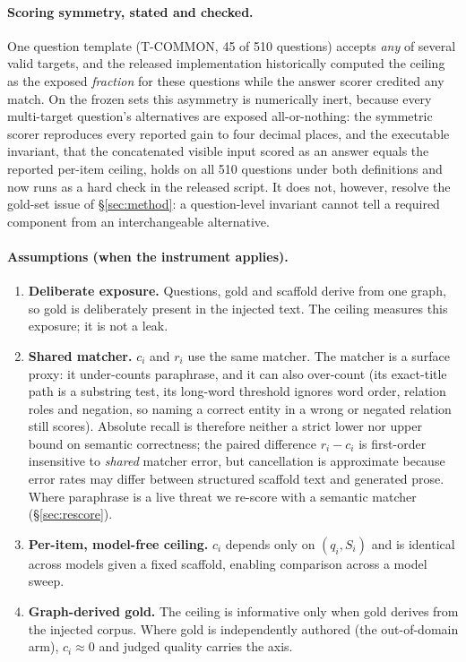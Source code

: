 \documentclass[10pt,twocolumn]{article}
\begin{document}
\paragraph{Scoring symmetry, stated and checked.} One question template (T-COMMON, 45 of 510 questions) accepts \emph{any} of several valid targets, and the released implementation historically computed the ceiling as the exposed \emph{fraction} for these questions while the answer scorer credited any match. On the frozen sets this asymmetry is numerically inert, because every multi-target question's alternatives are exposed all-or-nothing: the symmetric scorer reproduces every reported gain to four decimal places, and the executable invariant, that the concatenated visible input scored as an answer equals the reported per-item ceiling, holds on all 510 questions under both definitions and now runs as a hard check in the released script. It does not, however, resolve the gold-set issue of \S\ref{sec:method}: a question-level invariant cannot tell a required component from an interchangeable alternative.

\paragraph{Assumptions (when the instrument applies).}
\begin{enumerate}[label=(A\arabic*),topsep=2pt,itemsep=1pt,leftmargin=2.4em]
\item \textbf{Deliberate exposure.} Questions, gold and scaffold derive from one graph, so gold is deliberately present in the injected text. The ceiling measures this exposure; it is not a leak.
\item \textbf{Shared matcher.} $c_i$ and $r_i$ use the same matcher. The matcher is a surface proxy: it under-counts paraphrase, and it can also over-count (its exact-title path is a substring test, its long-word threshold ignores word order, relation roles and negation, so naming a correct entity in a wrong or negated relation still scores). Absolute recall is therefore neither a strict lower nor upper bound on semantic correctness; the paired difference $r_i-c_i$ is first-order insensitive to \emph{shared} matcher error, but cancellation is approximate because error rates may differ between structured scaffold text and generated prose. Where paraphrase is a live threat we re-score with a semantic matcher (\S\ref{sec:rescore}).
\item \textbf{Per-item, model-free ceiling.} $c_i$ depends only on $(q_i,S_i)$ and is identical across models given a fixed scaffold, enabling comparison across a model sweep.
\item \textbf{Graph-derived gold.} The ceiling is informative only when gold derives from the injected corpus. Where gold is independently authored (the out-of-domain arm), $c_i\approx0$ and judged quality carries the axis.
\end{enumerate}
\end{document}
